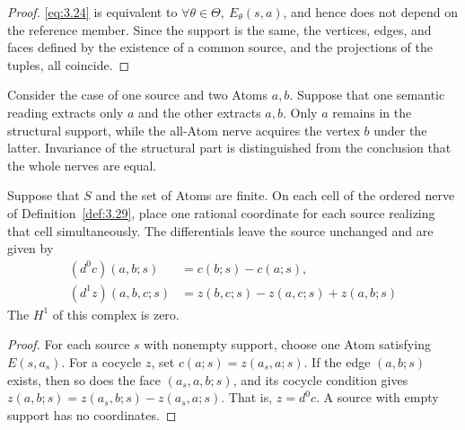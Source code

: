 \begin{proof}

\eqref{eq:3.24} is equivalent to $\forall\theta\in\Theta,\ E_\theta(s,a)$, and hence
does not depend on the reference member. Since the support is the same, the
vertices, edges, and faces defined by the existence of a common source, and the
projections of the tuples, all coincide.

\end{proof}

\begin{example}\label{ex:3.31}

Consider the case of one source and two Atoms $a,b$.
Suppose that one semantic reading extracts only $a$ and the other extracts $a,b$.
Only $a$ remains in the structural support, while the all-Atom nerve acquires the
vertex $b$ under the latter.
Invariance of the structural part is distinguished from the conclusion that the
whole nerves are equal.

\end{example}

\begin{proposition}\label{prop:3.32}

Suppose that $S$ and the set of Atoms are finite.
On each cell of the ordered nerve of Definition~\ref{def:3.29}, place one rational
coordinate for each source realizing that cell simultaneously.
The differentials leave the source unchanged and are given by
\begin{equation*}
\begin{aligned}
(d^0c)(a,b;s)&=c(b;s)-c(a;s),\\
(d^1z)(a,b,c;s)&=z(b,c;s)-z(a,c;s)+z(a,b;s)
\end{aligned}
\tag{3.25}\label{eq:3.25}
\end{equation*}
The $H^1$ of this complex is zero.

\end{proposition}

\begin{proof}

For each source $s$ with nonempty support, choose one Atom satisfying $E(s,a_s)$.
For a cocycle $z$, set $c(a;s)=z(a_s,a;s)$.
If the edge $(a,b;s)$ exists, then so does the face $(a_s,a,b;s)$, and its cocycle
condition gives $z(a,b;s)=z(a_s,b;s)-z(a_s,a;s)$.
That is, $z=d^0c$. A source with empty support has no coordinates.

\end{proof}

